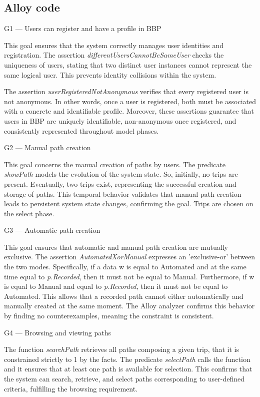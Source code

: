 \subsection{Alloy code}
G1 — Users can register and have a profile in BBP

This goal ensures that the system correctly manages user identities and registration.
The assertion \textit{differentUsersCannotBeSameUser} checks the uniqueness of users, stating that two distinct user instances cannot represent the same logical user. This prevents identity collisions within the system.

The assertion \textit{userRegisteredNotAnonymous} verifies that every registered user is not anonymous. In other words, once a user is registered, both must be associated with a concrete and identifiable profile. Moreover, these assertions guarantee that users in BBP are uniquely identifiable, non-anonymous once registered, and consistently represented throughout model phases.

G2 — Manual path creation

This goal concerns the manual creation of paths by users. The predicate \textit{showPath} models the evolution of the system state. So, initially, no trips are present. Eventually, two trips exist, representing the successful creation and storage of paths. This temporal behavior validates that manual path creation leads to persistent system state changes, confirming the goal. Trips are chosen on the select phase. 

G3 — Automatic path creation

This goal ensures that automatic and manual path creation are mutually exclusive.
The assertion \textit{AutomatedXorManual} expresses an 'exclusive-or' between the two modes. Specifically, if a data w is equal to Automated and at the same time equal to \textit{p.Recorded}, then it must not be equal to Manual. Furthermore, if w is equal to Manual and equal to \textit{p.Recorded}, then it must not be equal to Automated. This allows that a recorded path cannot either automatically and manually created at the same moment. The Alloy analyzer confirms this behavior by finding no counterexamples, meaning the constraint is consistent.

G4 — Browsing and viewing paths

The function \textit{searchPath} retrieves all paths composing a given trip, that it is constrained strictly to 1 by the facts. The predicate \textit{selectPath} calls the function and it ensures that at least one path is available for selection. This confirms that the system can search, retrieve, and select paths corresponding to user-defined criteria, fulfilling the browsing requirement. 

